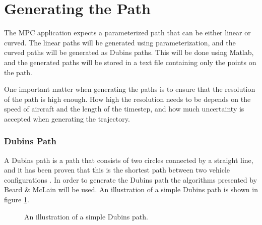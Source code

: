 \section{Generating the Path}

The MPC application expects a parameterized path that can be either linear or curved. The linear paths will be generated using parameterization, and the curved paths will be generated as Dubins paths. This will be done using Matlab, and the generated paths will be stored in a text file containing only the points on the path.

One important matter when generating the paths is to ensure that the resolution of the path is high enough. How high the resolution needs to be depends on the speed of aircraft and the length of the timestep, and how much uncertainty is accepted when generating the trajectory. 


\subsubsection{Dubins Path}

A Dubins path is a path that consists of two circles connected by a straight line, and it has been proven that this is the shortest path between two vehicle configurations \cite{DUBINS}. In order to generate the Dubins path the algorithms presented by Beard \& McLain \cite{uavBEARD} will be used. An illustration of a simple Dubins path is shown in figure \ref{fig:dubins}.

\begin{figure}[h]
	\centering
	\caption{An illustration of a simple Dubins path.}
	\label{fig:dubins}
\end{figure}